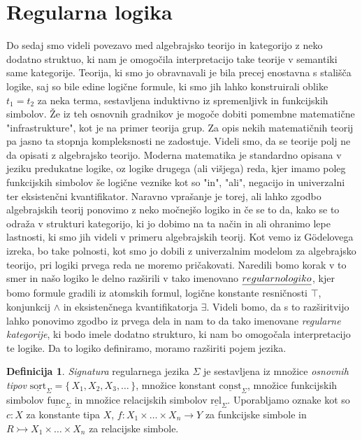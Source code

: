 \documentclass[12pt,a4paper]{book}
\theoremstyle{definition}
\newtheorem{definicija}{Definicija}[chapter]
\theoremstyle{plain}
\theoremstyle{definition}
\theoremstyle{remark}
\renewcommand{\set}[1]{\{\,#1\,\}}
\begin{document}
\section{Regularna logika}
Do sedaj smo videli povezavo med algebrajsko teorijo in kategorijo z neko dodatno struktuo, ki nam je omogočila interpretacijo take teorije v semantiki same kategorije. Teorija, ki smo jo obravnavali je bila precej enostavna s stališča logike, saj so bile edine logične formule, ki smo jih lahko konstruirali oblike $t_1 = t_2$ za neka terma, sestavljena induktivno iz spremenljivk in funkcijskih simbolov. 
Že iz teh osnovnih gradnikov je mogoče dobiti pomembne matematične "infrastrukture", kot je na primer teorija grup. Za opis nekih matematičnih teorij pa jasno ta stopnja kompleksnosti ne zadostuje.
Videli smo, da se teorije polj ne da opisati z algebrajsko teorijo. Moderna matematika je standardno opisana v jeziku predukatne logike, oz logike drugega (ali višjega) reda, kjer imamo poleg funkcijskih simbolov še logične veznike kot so "in", "ali", negacijo in univerzalni ter eksistenčni kvantifikator.
Naravno vprašanje je torej, ali lahko zgodbo algebrajskih teorij ponovimo z neko močnejšo logiko in če se to da, kako se to odraža v strukturi kategorijo, ki jo dobimo na ta način in ali ohranimo lepe lastnosti, ki smo jih videli v primeru algebrajskih teorij.
Kot vemo iz Gödelovega izreka, bo take polnosti, kot smo jo dobili z univerzalnim modelom za algebrajsko teorijo, pri logiki prvega reda ne moremo pričakovati.
Naredili bomo korak v to smer in našo logiko le delno razširili v tako imenovano $\emph{regularno logiko}$, kjer bomo formule gradili iz atomskih formul, logične konstante resničnosti $\top$, konjunkcij $\wedge$ in eksistenčnega kvantifikatorja $\exists$.
Videli bomo, da s to razširitvijo lahko ponovimo zgodbo iz prvega dela in nam to da tako imenovane \emph{regularne kategorije}, ki bodo imele dodatno strukturo, ki nam bo omogočala interpretacijo te logike.
Da to logiko definiramo, moramo razširiti pojem jezika.
%
\begin{definicija}
  \emph{Signatura} regularnega jezika $\Sigma$ je sestavljena iz množice \emph{osnovnih tipov} $\underline{\mathrm{sort}}_\Sigma = \set{X_1, X_2, X_3, \ldots}$, množice konstant $\underline{\mathrm{const}}_\Sigma$, množice funkcijskih simbolov $\underline{\mathrm{func}}_\Sigma$ in množice relacijskih simbolov $\underline{\mathrm{rel}}_\Sigma$. Uporabljamo oznake kot so $c : X$ za konstante tipa $X$, $f : X_1 \times \ldots \times X_n \to Y$ za funkcijske simbole in $R \rightarrowtail X_1 \times \ldots \times X_n$ za relacijske simbole.
\end{definicija}
\end{document}

